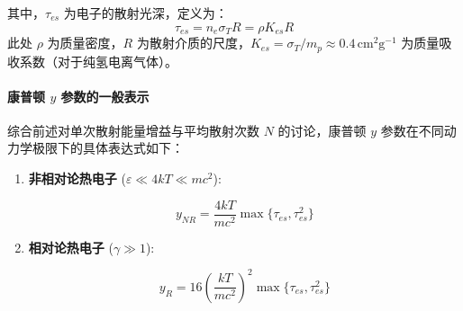 其中，$\tau_{es}$ 为电子的散射光深，定义为：
\begin{equation}
    \tau_{es} = n_e \sigma_T R = \rho K_{es} R
\end{equation}
此处 $\rho$ 为质量密度，$R$ 为散射介质的尺度，$K_{es} = \sigma_T / m_p \approx 0.4 \, \text{cm}^2 \text{g}^{-1}$ 为质量吸收系数（对于纯氢电离气体）。
\paragraph{康普顿 $y$ 参数的一般表示}
综合前述对单次散射能量增益与平均散射次数 $N$ 的讨论，康普顿 $y$ 参数在不同动力学极限下的具体表达式如下：

\begin{enumerate}
    \item \textbf{非相对论热电子} ($\varepsilon \ll 4kT \ll mc^2$):
    \begin{tcolorbox}[colframe=black, colback=white, boxrule=0.5pt, arc=0pt]
    \begin{equation}
        y_{NR} = \frac{4kT}{mc^2} \max\{\tau_{es}, \tau_{es}^2\}
    \end{equation}
    \end{tcolorbox}

    \item \textbf{相对论热电子} ($\gamma \gg 1$):
    \begin{tcolorbox}[colframe=black, colback=white, boxrule=0.5pt, arc=0pt]
    \begin{equation}
        y_{R} = 16 \left( \frac{kT}{mc^2} \right)^2 \max\{\tau_{es}, \tau_{es}^2\}
    \end{equation}
    \end{tcolorbox}
\end{enumerate}

